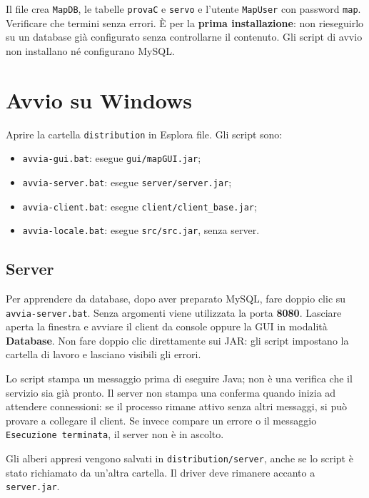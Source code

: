 \documentclass[11pt,a4paper]{article}
\begin{document}
Il file crea \texttt{MapDB}, le tabelle \texttt{provaC} e \texttt{servo} e
l'utente \texttt{MapUser} con password \texttt{map}. Verificare che termini
senza errori. È per la \textbf{prima installazione}: non rieseguirlo su un
database già configurato senza controllarne il contenuto.
Gli script di avvio non installano né configurano MySQL.

\clearpage
\section*{Avvio su Windows}

Aprire la cartella \texttt{distribution} in Esplora file. Gli script sono:
\begin{itemize}
  \item \texttt{avvia-gui.bat}: esegue \texttt{gui/mapGUI.jar};
  \item \texttt{avvia-server.bat}: esegue \texttt{server/server.jar};
  \item \texttt{avvia-client.bat}: esegue \texttt{client/client\_base.jar};
  \item \texttt{avvia-locale.bat}: esegue \texttt{src/src.jar}, senza server.
\end{itemize}

\subsection*{Server}

Per apprendere da database, dopo aver preparato MySQL, fare doppio clic su
\texttt{avvia-server.bat}. Senza argomenti viene utilizzata la porta
\textbf{8080}. Lasciare aperta la finestra e avviare il client da console
oppure la GUI in modalità \textbf{Database}. Non fare doppio clic direttamente
sui JAR: gli script impostano la cartella di lavoro e lasciano visibili gli errori.

Lo script stampa un messaggio prima di eseguire Java; non è una verifica
che il servizio sia già pronto. Il server non stampa una conferma quando
inizia ad attendere connessioni: se il processo rimane attivo senza altri
messaggi, si può provare a collegare il client. Se invece compare un errore
o il messaggio \texttt{Esecuzione terminata}, il server non è in ascolto.

Gli alberi appresi vengono salvati in \texttt{distribution/server}, anche
se lo script è stato richiamato da un'altra cartella. Il driver
 deve rimanere accanto a \texttt{server.jar}.
\end{document}
